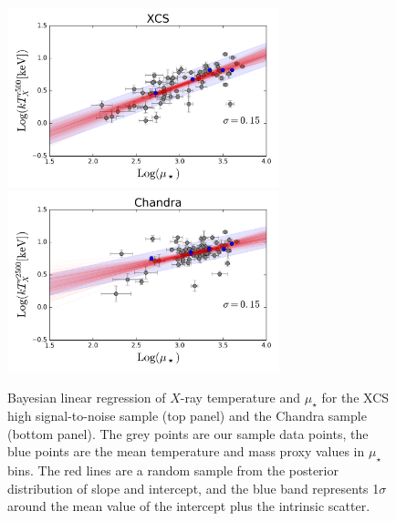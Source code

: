 \begin{figure}\centering\includegraphics[width=0.7\textwidth]{./chapters/chapter5/figs/xmm_mu_scatter.png}
\includegraphics[width=0.7\textwidth]{./chapters/chapter5/figs/chandra_r2500_mu_iz_scatter.png}\caption{Bayesian linear regression of $X$-ray temperature and $\mu_\star$ for the XCS high signal-to-noise sample (top panel) and the Chandra sample (bottom panel). The grey points are our sample data points, the blue points are the mean temperature and mass proxy values in $\mu_\star$ bins. The red lines are a random sample from the posterior distribution of slope and intercept, and the blue band represents 1$\sigma$ around the mean value of the intercept plus the intrinsic scatter.}\label{fig:tx}\end{figure}


